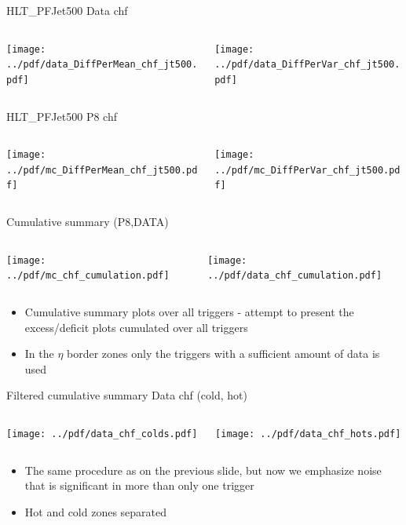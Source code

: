 \documentclass[9pt]{beamer}
\begin{document}
\begin{frame}[t]{HLT\_PFJet500 Data chf}
\begin{columns}[T]
  \begin{column}{.5\textwidth}
  \texttt{[image: ../pdf/data\_DiffPerMean\_chf\_jt500.pdf]}
  \end{column}
  \begin{column}{.5\textwidth}
  \texttt{[image: ../pdf/data\_DiffPerVar\_chf\_jt500.pdf]}
  \end{column}
\end{columns}
\end{frame}

\begin{frame}[t]{HLT\_PFJet500 P8 chf}
\begin{columns}[T]
  \begin{column}{.5\textwidth}
  \texttt{[image: ../pdf/mc\_DiffPerMean\_chf\_jt500.pdf]}
  \end{column}
  \begin{column}{.5\textwidth}
  \texttt{[image: ../pdf/mc\_DiffPerVar\_chf\_jt500.pdf]}
  \end{column}
\end{columns}
\end{frame}

\begin{frame}[t]{Cumulative summary (P8,DATA)}
\begin{columns}[T]
  \begin{column}{.5\textwidth}
  \texttt{[image: ../pdf/mc\_chf\_cumulation.pdf]}
  \end{column}
  \begin{column}{.5\textwidth}
  \texttt{[image: ../pdf/data\_chf\_cumulation.pdf]}
  \end{column}
\end{columns}
\begin{itemize}
 \item Cumulative summary plots over all triggers - attempt to present the excess/deficit plots cumulated over all triggers
 \item In the $\eta$ border zones only the triggers with a sufficient amount of data is used
\end{itemize}
\end{frame}

\begin{frame}[t]{Filtered cumulative summary Data chf (cold, hot)}
\begin{columns}[T]
  \begin{column}{.5\textwidth}
  \texttt{[image: ../pdf/data\_chf\_colds.pdf]}
  \end{column}
  \begin{column}{.5\textwidth}
  \texttt{[image: ../pdf/data\_chf\_hots.pdf]}
  \end{column}
\end{columns}
\begin{itemize}
 \item The same procedure as on the previous slide, but now we emphasize noise that is significant in more than only one trigger
 \item Hot and cold zones separated
\end{itemize}
\end{frame}
\end{document}
